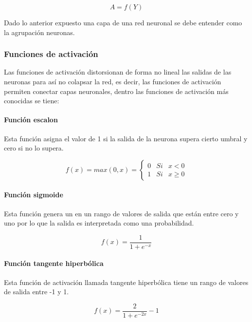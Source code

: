 \documentclass[
  12pt,
]{article}
\begin{document}
\[A = f(Y)\]

Dado lo anterior expuesto una capa de una red neuronal se debe entender
como la agrupación neuronas.

\hypertarget{funciones-de-activaciuxf3n}{%
\subsubsection{Funciones de
activación}\label{funciones-de-activaciuxf3n}}

Las funciones de activación distorsionan de forma no lineal las salidas
de las neuronas para así no colapsar la red, es decir, las funciones de
activación permiten conectar capas neuronales, dentro las funciones de
activación más conocidas se tiene:

\hypertarget{funciuxf3n-escalon}{%
\paragraph{Función escalon}\label{funciuxf3n-escalon}}

Esta función asigna el valor de 1 si la salida de la neurona supera
cierto umbral y cero si no lo supera.

\[ f(x) = max(0,x) = \left \{
\begin{array}{rcl}
     0 & Si & x < 0
  \\ 1 & Si & x \geq{0}
\end{array}
\right. \]

\hypertarget{funciuxf3n-sigmoide}{%
\paragraph{Función sigmoide}\label{funciuxf3n-sigmoide}}

Esta función genera un en un rango de valores de salida que están entre
cero y uno por lo que la salida es interpretada como una probabilidad.

\[ f(x) = \frac{1}{1+e^{-x}}\]

\hypertarget{funciuxf3n-tangente-hiperbuxf3lica}{%
\paragraph{Función tangente
hiperbólica}\label{funciuxf3n-tangente-hiperbuxf3lica}}

Esta función de activación llamada tangente hiperbólica tiene un rango
de valores de salida entre -1 y 1.

\[ f(x) = \frac{2}{1+e^{-2x}} - 1 \]
\end{document}
